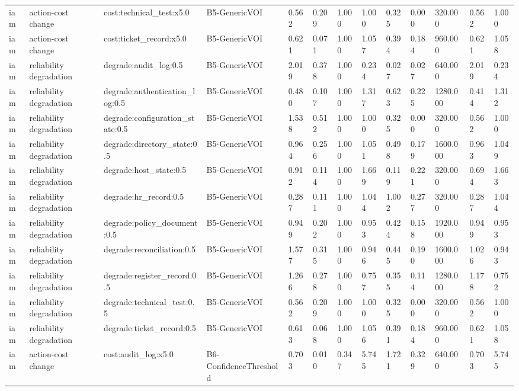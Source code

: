 \begin{table}[!ht]
{\begin{tabular}{lllllllllllll}
iam & action-cost change & cost:technical\_test:x5.0 & B5-GenericVOI & 0.562 & 0.209 & 1.000 & 1.000 & 0.325 & 0.000 & 320.000 & 0.562 & 1.000 \\
iam & action-cost change & cost:ticket\_record:x5.0 & B5-GenericVOI & 0.621 & 0.071 & 1.000 & 1.057 & 0.394 & 0.184 & 960.000 & 0.621 & 1.058 \\
iam & reliability degradation & degrade:audit\_log:0.5 & B5-GenericVOI & 2.019 & 0.378 & 1.000 & 0.234 & 0.027 & 0.027 & 640.000 & 2.019 & 0.234 \\
iam & reliability degradation & degrade:authentication\_log:0.5 & B5-GenericVOI & 0.480 & 0.107 & 1.000 & 1.317 & 0.623 & 0.225 & 1280.000 & 0.414 & 1.312 \\
iam & reliability degradation & degrade:configuration\_state:0.5 & B5-GenericVOI & 1.538 & 0.512 & 1.000 & 1.000 & 0.325 & 0.000 & 320.000 & 0.562 & 1.000 \\
iam & reliability degradation & degrade:directory\_state:0.5 & B5-GenericVOI & 0.964 & 0.256 & 1.000 & 1.051 & 0.498 & 0.179 & 1600.000 & 0.963 & 1.049 \\
iam & reliability degradation & degrade:host\_state:0.5 & B5-GenericVOI & 0.912 & 0.114 & 1.000 & 1.669 & 0.119 & 0.221 & 320.000 & 0.694 & 1.663 \\
iam & reliability degradation & degrade:hr\_record:0.5 & B5-GenericVOI & 0.287 & 0.111 & 1.000 & 1.044 & 1.002 & 0.277 & 320.000 & 0.287 & 1.044 \\
iam & reliability degradation & degrade:policy\_document:0.5 & B5-GenericVOI & 0.949 & 0.202 & 1.000 & 0.953 & 0.424 & 0.158 & 1920.000 & 0.949 & 0.953 \\
iam & reliability degradation & degrade:reconciliation:0.5 & B5-GenericVOI & 1.577 & 0.315 & 1.000 & 0.946 & 0.445 & 0.190 & 1600.000 & 1.026 & 0.943 \\
iam & reliability degradation & degrade:register\_record:0.5 & B5-GenericVOI & 1.266 & 0.278 & 1.000 & 0.757 & 0.355 & 0.114 & 1280.000 & 1.178 & 0.752 \\
iam & reliability degradation & degrade:technical\_test:0.5 & B5-GenericVOI & 0.562 & 0.209 & 1.000 & 1.000 & 0.325 & 0.000 & 320.000 & 0.562 & 1.000 \\
iam & reliability degradation & degrade:ticket\_record:0.5 & B5-GenericVOI & 0.613 & 0.068 & 1.000 & 1.056 & 0.391 & 0.184 & 960.000 & 0.621 & 1.058 \\
iam & action-cost change & cost:audit\_log:x5.0 & B6-ConfidenceThreshold & 0.703 & 0.010 & 0.347 & 5.745 & 1.721 & 0.329 & 640.000 & 0.703 & 5.745 \\

\end{tabular}}
\end{table}
